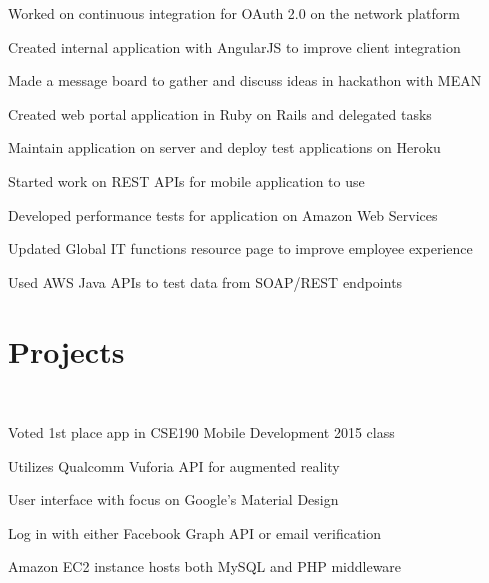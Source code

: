 \documentclass[]{deedy-resume-openfont}
\begin{document}
\begin{minipage}[t]{0.66\textwidth}
\begin{tightemize}
\item Worked on continuous integration for OAuth 2.0 on the network platform
\item Created internal application with AngularJS to improve client integration
\item Made a message board to gather and discuss ideas in hackathon with MEAN
\end{tightemize}
\sectionsep

\begin{tightemize}
\item Created web portal application in Ruby on Rails and delegated tasks
\item Maintain application on server and deploy test applications on Heroku
\item Started work on REST APIs for mobile application to use
\end{tightemize}
\sectionsep

\begin{tightemize}
\item Developed performance tests for application on Amazon Web Services
\item Updated Global IT functions resource page to improve employee experience
\item Used AWS Java APIs to test data from SOAP/REST endpoints
\end{tightemize}
\sectionsep


\section{Projects}
\href{http://augmonted.github.io}{} \\
\begin{tightemize}
\item Voted 1st place app in CSE190 Mobile Development 2015 class
\item Utilizes Qualcomm Vuforia API for augmented reality
\item User interface with focus on Google's Material Design
\item Log in with either Facebook Graph API or email verification
\item Amazon EC2 instance hosts both MySQL and PHP middleware
\end{tightemize}
\sectionsep


\end{minipage}
\end{document}
